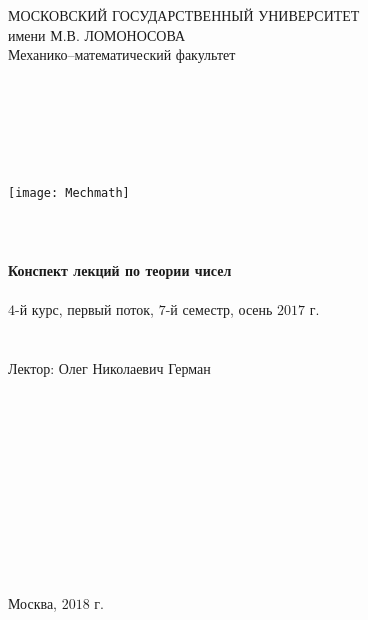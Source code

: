 \begin{center}~\\~\\~\\~\\~\\
	\textrm{{\large МОСКОВСКИЙ ГОСУДАРСТВЕННЫЙ УНИВЕРСИТЕТ}\\
		{\large имени М.В. ЛОМОНОСОВА}\\
		{\large Механико--математический факультет}\\
		~\\~\\~\\~\\~\\~\\
		\texttt{[image: Mechmath]}
		~\\~\\~\\~\\
		{\LARGE \bf Конспект лекций по теории чисел}
		~\\~\\
		{\large $4$-й курс, первый поток, $7$-й семестр, осень $2017$ г.}
		~\\~\\~\\
		{\large Лектор: Олег Николаевич Герман}}
	~\\~\\~\\~\\~\\~\\~\\~\\~\\~\\~\\~\\
	Москва, $2018$ г.
\end{center}